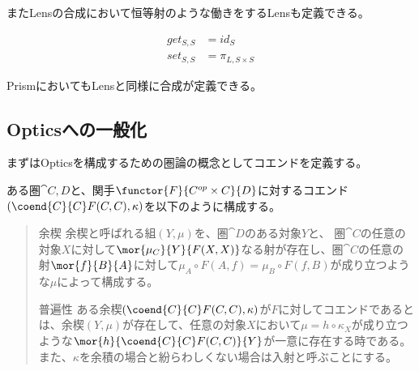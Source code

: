 \documentclass[uplatex,dvipdfmx]{jsarticle}
\begin{document}
  またLensの合成において恒等射のような働きをするLensも定義できる。
  \begin{define}[恒等Lens]\label{def-identity-lens}
    \begin{align*}
      get_{S,S} &= id_S\\
      set_{S,S} &= \pi_{L,S\times S}
    \end{align*}
  \end{define}
  PrismにおいてもLensと同様に合成が定義できる。
  \subsection{Opticsへの一般化}
  まずはOpticsを構成するための圏論の概念としてコエンドを定義する。
  \begin{define}[コエンド]\label{def-coend}
    ある圏$\cat{C,D}$と、関手$\functor{F}{C^{op}\times C}{D}$に対するコエンド$(\coend{C}{C} F(C,C),\kappa)$を以下のように構成する。
    \begin{quote}
      \begin{mydescription}
        \item[余楔] 余楔と呼ばれる組$(Y,\mu)$を、圏$\cat{D}$のある対象$Y$と、
        圏$\cat{C}$の任意の対象$X$に対して$\mor{\mu_C}{Y}{F(X,X)}$なる射が存在し、圏$\cat{C}$の任意の射$\mor{f}{B}{A}$に対して$\mu_A\circ F(A,f)=\mu_B\circ F(f,B)$が成り立つような$\mu$によって構成する。
        \begin{center}
        \end{center}
        \item[普遍性] ある余楔$(\coend{C}{C}F(C,C),\kappa)$が$F$に対してコエンドであるとは、余楔$(Y,\mu)$が存在して、任意の対象$X$において$\mu=h\circ \kappa_X$が成り立つような$\mor{h}{\coend{C}{C} F(C,C)}{Y}$が一意に存在する時である。
        また、$\kappa$を余積の場合と紛らわしくない場合は入射と呼ぶことにする。
        \begin{center}
\end{center}
\end{mydescription}
\end{quote}
\end{define}
\end{document}
